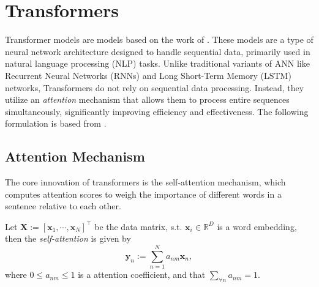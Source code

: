 \section{Transformers}\label{sec:transformers}
Transformer models are models based on the work of \cite{vaswani2017attention}. These models are a type of neural network architecture designed to handle sequential data, primarily used in natural language processing (NLP) tasks. Unlike traditional variants of ANN like Recurrent Neural Networks (RNNs) and Long Short-Term Memory (LSTM) networks, Transformers do not rely on sequential data processing. Instead, they utilize an \textit{attention} mechanism that allows them to process entire sequences simultaneously, significantly improving efficiency and effectiveness. The following formulation is based from \cite{bishop2023learning}.

\subsection{Attention Mechanism}\label{sec:attention-mechanism}
The core innovation of transformers is the self-attention mechanism, which computes attention scores to weigh the importance of different words in a sentence relative to each other. 

\begin{defn}\label{defn:vec-self-attention}
    Let $\mathbf{X}:=[\mathbf{x}_1,\cdots,\mathbf{x}_N]^{\top}$ be the data matrix, s.t. $\mathbf{x}_i\in\mathbb{R}^{D}$ is a word embedding, then the \textit{self-attention} is given by
    \begin{equation}\label{eq:self-attention}
        \mathbf{y}_n := \sum_{n=1}^{N}a_{nm}\mathbf{x}_n,
    \end{equation}
    where $0\leq a_{nm}\leq 1$ is a attention coefficient, and that $\sum_{\forall n}a_{nm}=1$.
\end{defn}

